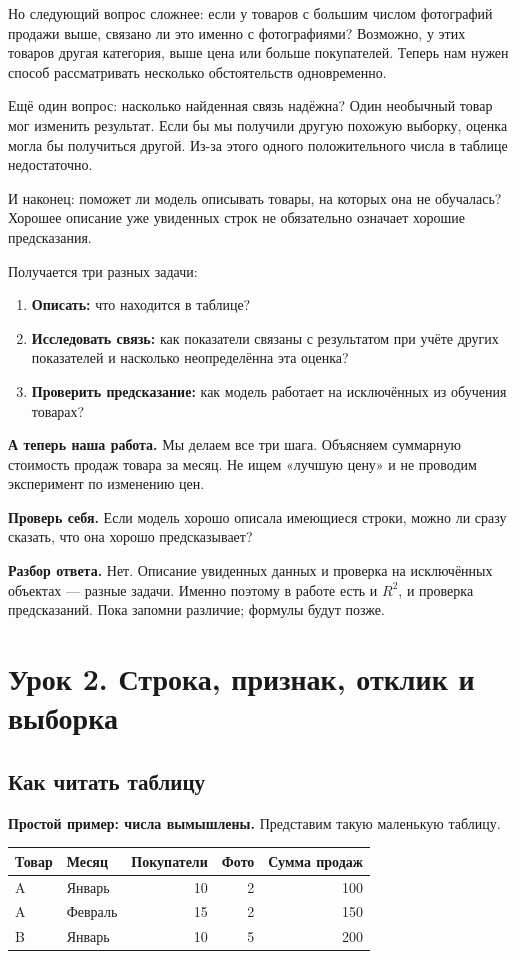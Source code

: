 \documentclass[12pt,a4paper]{article}
\newcommand{\toy}[1]{\par\textbf{Простой пример: числа вымышлены.} #1\par}
\newcommand{\ours}[1]{\par\textbf{А теперь наша работа.} #1\par}
\newcommand{\check}[2]{\par\textbf{Проверь себя.} #1\par\textbf{Разбор ответа.} #2\par}
\begin{document}
Но следующий вопрос сложнее: если у товаров с большим числом фотографий продажи выше, связано ли это именно с фотографиями? Возможно, у этих товаров другая категория, выше цена или больше покупателей. Теперь нам нужен способ рассматривать несколько обстоятельств одновременно.

Ещё один вопрос: насколько найденная связь надёжна? Один необычный товар мог изменить результат. Если бы мы получили другую похожую выборку, оценка могла бы получиться другой. Из-за этого одного положительного числа в таблице недостаточно.

И наконец: поможет ли модель описывать товары, на которых она не обучалась? Хорошее описание уже увиденных строк не обязательно означает хорошие предсказания.

Получается три разных задачи:
\begin{enumerate}
\item \textbf{Описать:} что находится в таблице?
\item \textbf{Исследовать связь:} как показатели связаны с результатом при учёте других показателей и насколько неопределённа эта оценка?
\item \textbf{Проверить предсказание:} как модель работает на исключённых из обучения товарах?
\end{enumerate}

\ours{Мы делаем все три шага. Объясняем суммарную стоимость продаж товара за месяц. Не ищем «лучшую цену» и не проводим эксперимент по изменению цен.}

\check{Если модель хорошо описала имеющиеся строки, можно ли сразу сказать, что она хорошо предсказывает?}{Нет. Описание увиденных данных и проверка на исключённых объектах --- разные задачи. Именно поэтому в работе есть и $R^2$, и проверка предсказаний. Пока запомни различие; формулы будут позже.}

\section{Урок 2. Строка, признак, отклик и выборка}

\subsection{Как читать таблицу}

\toy{Представим такую маленькую таблицу.}
\begin{center}
\begin{tabular}{llrrr}
\toprule Товар & Месяц & Покупатели & Фото & Сумма продаж\\\midrule
A & Январь & 10 & 2 & 100\\
A & Февраль & 15 & 2 & 150\\
B & Январь & 10 & 5 & 200\\
\bottomrule\end{tabular}
\end{center}
\end{document}
